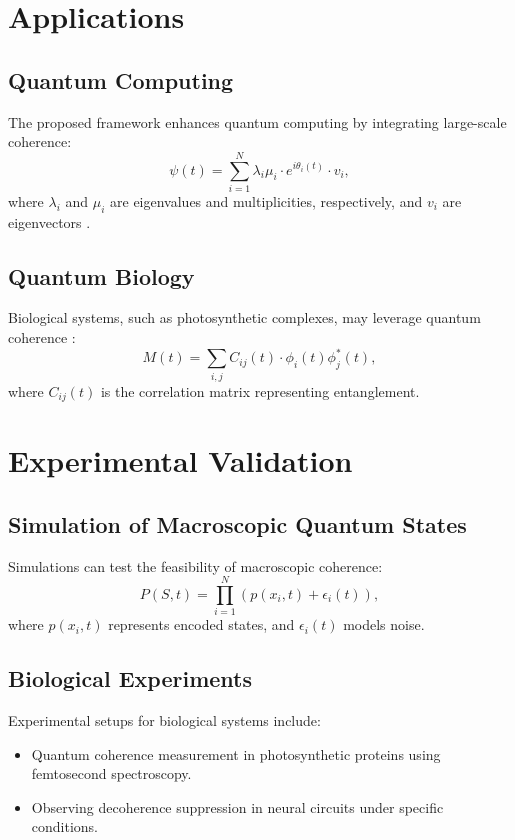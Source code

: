\documentclass{article}
\theoremstyle{plain}
\begin{document}
\section{Applications}

\subsection{Quantum Computing}
The proposed framework enhances quantum computing by integrating large-scale coherence:\newline
\begin{equation}
\psi(t) = \sum_{i=1}^N \lambda_i \mu_i \cdot e^{i\theta_i(t)} \cdot v_i,
\end{equation}
where $\lambda_i$ and $\mu_i$ are eigenvalues and multiplicities, respectively, and $v_i$ are eigenvectors \cite{van2024unified}.

\subsection{Quantum Biology}
Biological systems, such as photosynthetic complexes, may leverage quantum coherence \cite{galioto2024dynamic}:
\begin{equation}
M(t) = \sum_{i,j} C_{ij}(t) \cdot \phi_i(t) \phi_j^*(t),
\end{equation}
where $C_{ij}(t)$ is the correlation matrix representing entanglement.

\section{Experimental Validation}

\subsection{Simulation of Macroscopic Quantum States}
Simulations can test the feasibility of macroscopic coherence:\newline
\begin{equation}
P(S, t) = \prod_{i=1}^N \left(p(x_i, t) + \epsilon_i(t)\right),
\end{equation}
where $p(x_i, t)$ represents encoded states, and $\epsilon_i(t)$ models noise.

\subsection{Biological Experiments}
Experimental setups for biological systems include: 
\begin{itemize}
    \item Quantum coherence measurement in photosynthetic proteins using femtosecond spectroscopy.
    \item Observing decoherence suppression in neural circuits under specific conditions.
\end{itemize}
\end{document}
